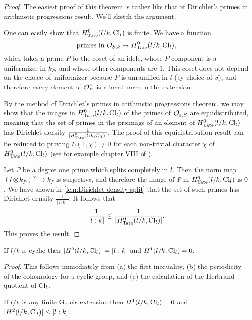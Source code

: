 \begin{proof}
	The easiest proof of this theorem is rather like that of Dirichlet's primes in arithmetic
	progressions result.
	We'll sketch the argument.

	One can easily show that $H^0_{\mathrm{Tate}}(l/k, \mathrm{Cl}_{l})$ is finite.
	We have a function
	\[
		\textrm{primes in ${\mathcal O}_{S,k}$} \to H^0_{\mathrm{Tate}}(l/k, \mathrm{Cl}_{l}),
	\]
	which takes a prime $P$ to the coset of an idele, whose $P$ component is
	a uniformizer in $k_P$, and whose other components are $1$.
	This coset does not depend on the choice of uniformizer because $P$ is unramified in $l$
	(by choice of $S$), and therefore every element of ${\mathcal O}_P^\times$ is a local norm in the extension.

	By the method of Dirichlet's primes in arithmetic progressions theorem, we may show that
	the images in $H^0_{\mathrm{Tate}}(l/k, \mathrm{Cl}_{l})$ of the primes of ${\mathcal O}_{k,S}$ are equidistributed,
	meaning that the set of primes in the preimage of an element of $H^0_{\mathrm{Tate}}(l/k, \mathrm{Cl}_{l})$ has
	Dirichlet density $\frac{1}{|H^0_{\mathrm{Tate}}(l/k, \mathrm{Cl}_{l})|}$. The proof of this equidistribution
	result can be reduced to proving $L(1,\chi) \ne 0$ for each non-trivial character
	$\chi$ of $H^0_{\mathrm{Tate}}(l/k,\mathrm{Cl}_l)$ (see for example chapter VIII of \cite{cassells frohlich}).

	Let $P$ be a degree one prime which splits completely in $l$.
	Then the norm map $(l \otimes k_P)^\times \to k_P$ is surjective,
	and therefore the image of $P$ in $H^0_{\mathrm{Tate}}(l/k, \mathrm{Cl}_{l})$ is $0$.
	We have shown in \ref{lem:Dirichlet density split} that the set of such primes has
	Dirichlet density $\frac{1}{[l:k]}$. It follows that
	\[
		\frac{1}{[l:k]} \le \frac{1}{|H^0_{\mathrm{Tate}}(l/k, \mathrm{Cl}_{l})|}.
	\]
	This proves the result.
\end{proof}


\begin{corollary} \label{cor:H1 H2 cyclic idele class}
	If $l/k$ is cyclic then $|H^2(l/k, \mathrm{Cl}_{l})| = [l:k]$ and $H^1(l/k, \mathrm{Cl}_{l}) = 0$.
\end{corollary}

\begin{proof}
	This follows immediately from (a) the first inequality, (b) the periodicity of
	the cohomology for a cyclic group, and (c) the calculation of the Herbrand quotient
	of $\mathrm{Cl}_{l}$.
\end{proof}

\begin{theorem}
	If $l/k$ is any finite Galois extension then $H^1(l/k, \mathrm{Cl}_{l}) = 0$
	and $|H^2(l/k, \mathrm{Cl}_{l})| \le [l:k]$.
\end{theorem}


